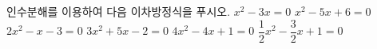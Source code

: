 인수분해를 이용하여 다음 이차방정식을 푸시오.
 $x^2-3x=0$
 $x^2-5x+6=0$
 $2x^2-x-3=0$
 $3x^2+5x-2=0$
 $4x^2-4x+1=0$
 $\dfrac{1}{2}x^2-\dfrac{3}{2}x+1=0$
